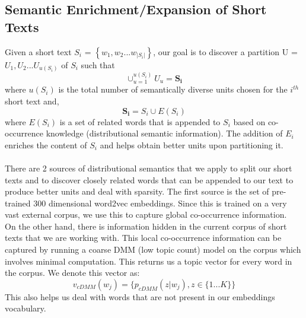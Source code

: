 \documentclass{sig-alternate-05-2015}
\begin{document}
\subsection{Semantic Enrichment/Expansion of Short Texts}
Given a short text $S_{i}$ = $\left\lbrace w_{1},w_{2} ... w_{|S_{i}|} \right\rbrace$, our goal is to discover a partition U = ${U_{1}, U_{2} ... U_{u(S_{i})}}$ of $S_{i}$ such that $$\cup_{u=1}^{u(S_{i})}U_{u} = \mathbf{S_{i}}$$ where $u(S_{i})$ is the total number of semantically diverse units chosen for the $i^{th}$  short text and, $$\mathbf{S_{i}} = S_{i} \cup E(S_{i})$$ where $E(S_{i})$ is a set of related words that is appended to $S_{i}$ based on co-occurrence knowledge (distributional semantic information). The addition of $E_{i}$ enriches the content of $S_{i}$ and helps obtain better units upon partitioning it.
\\
\\
There are 2 sources of distributional semantics that we apply to split our short texts and to discover closely related words that can be appended to our text to produce better units and deal with sparsity. The first source is the set of pre-trained 300 dimensional word2vec embeddings. Since this is trained on a very vast external corpus, we use this to capture global co-occurrence information.\\ On the other hand, there is information hidden in the current corpus of short texts that we are working with. This local co-occurrence information can be captured by running a coarse DMM (low topic count) model on the corpus which involves minimal computation. This returns us a topic vector for every word in the corpus. We denote this vector as:
$$v_{cDMM}(w_{j}) = \{p_{cDMM}(z|w_{j}), z \in \{1 ... K\}\}$$
This also helps us deal with words that are not present in our embeddings vocabulary.
\end{document}
